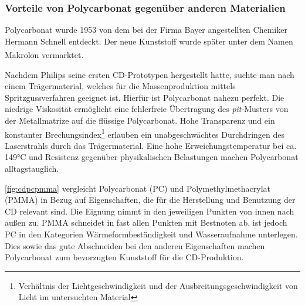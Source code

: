 \subsubsection{Vorteile von Polycarbonat gegenüber anderen Materialien}

Polycarbonat wurde 1953 von dem bei der Firma Bayer angestellten Chemiker
Hermann Schnell entdeckt. Der neue Kunststoff wurde später unter dem Namen
Makrolon\textsuperscript{\textregistered} vermarktet. \cite{cuzpc}

Nachdem Philips seine ersten CD-Prototypen hergestellt hatte, suchte man nach
einem Trägermaterial, welches für die Massenproduktion mittels
Spritzgussverfahren geeignet ist. Hierfür ist Polycarbonat nahezu perfekt. Die
niedrige Viskosität ermöglicht eine fehlerfreie Übertragung des
\textit{pit}-Musters von der Metallmatrize auf die flüssige Polycarbonat. Hohe
Transparenz und ein konstanter Brechungsindex\footnote{Verhältnis der
Lichtgeschwindigkeit und der Ausbreitungsgeschwindigkeit von Licht im
untersuchten Material} erlauben ein unabgeschwächtes Durchdringen des
Laserstrahls durch das Trägermaterial. Eine hohe Erweichungstemperatur bei ca.
149°C \cite{cuzpc2} und Resistenz gegenüber physikalischen Belastungen machen
Polycarbonat alltagstauglich. \cite{cfcd}

\autoref{fig:cdpcpmma} vergleicht Polycarbonat (PC) und Polymethylmethacrylat
(PMMA) in Bezug auf Eigenschaften, die für die Herstellung und Benutzung der CD
relevant sind. Die Eignung nimmt in den jeweiligen Punkten von innen nach außen
zu. PMMA schneidet in fast allen Punkten mit Bestnoten ab, ist jedoch PC in den
Kategorien Wärmeformbeständigkeit und Wasseraufnahme unterlegen. Dies sowie das
gute Abschneiden bei den anderen Eigenschaften machen Polycarbonat zum
bevorzugten Kunststoff für die CD-Produktion.

